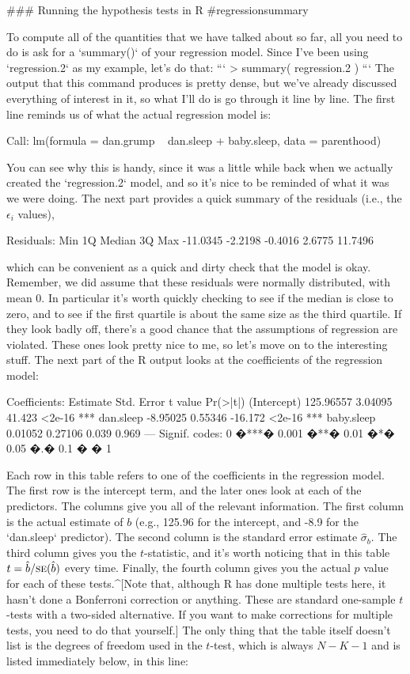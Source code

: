 ### Running the hypothesis tests in R {#regressionsummary}

To compute all of the quantities that we have talked about so far, all you need to do is ask for a `summary()` of your regression model. Since I've been using `regression.2` as my example, let's do that:
```
> summary( regression.2 )
```
The output that this command produces is pretty dense, but we've already discussed everything of interest in it, so what I'll do is go through it line by line. The first line reminds us of what the actual regression model is:
\begin{rblock}
Call:
lm(formula = dan.grump ~ dan.sleep + baby.sleep, data = parenthood)
\end{rblock}
You can see why this is handy, since it was a little while back when we actually created the `regression.2` model, and so it's nice to be reminded of what it was we were doing. The next part provides a quick summary of the residuals (i.e., the $\epsilon_i$ values), 
\begin{rblock}
Residuals:
     Min       1Q   Median       3Q      Max 
-11.0345  -2.2198  -0.4016   2.6775  11.7496 
\end{rblock}
which can be convenient as a quick and dirty check that the model is okay. Remember, we did assume that these residuals were normally distributed, with mean 0. In particular it's worth quickly checking to see if the median is close to zero, and to see if the first quartile is about the same size as the third quartile. If they look badly off, there's a good chance that the assumptions of regression are violated. These ones look pretty nice to me, so let's move on to the interesting stuff. The next part of the R output looks at the coefficients of the regression model:
\begin{rblock}
Coefficients:
             Estimate Std. Error t value Pr(>|t|)    
(Intercept) 125.96557    3.04095  41.423   <2e-16 ***
dan.sleep    -8.95025    0.55346 -16.172   <2e-16 ***
baby.sleep    0.01052    0.27106   0.039    0.969 
---
Signif. codes:  0 �***� 0.001 �**� 0.01 �*� 0.05 �.� 0.1 � � 1 
\end{rblock}
Each row in this table refers to one of the coefficients in the regression model. The first row is the intercept term, and the later ones look at each of the predictors. The columns give you all of the relevant information. The first column is the actual estimate of $b$ (e.g., 125.96 for the intercept, and -8.9 for the `dan.sleep` predictor). The second column is the standard error estimate $\hat\sigma_b$. The third column gives you the $t$-statistic, and it's worth noticing that in this table $t= \hat{b}/ \mbox{\textsc{se}}(\hat{b})$ every time. Finally, the fourth column gives you the actual $p$ value for each of these tests.^[Note that, although R has done multiple tests here, it hasn't done a Bonferroni correction or anything. These are standard one-sample $t$-tests with a two-sided alternative. If you want to make corrections for multiple tests, you need to do that yourself.] The only thing that the table itself doesn't list is the degrees of freedom used in the $t$-test, which is always $N-K-1$ and is listed immediately below, in this line:
